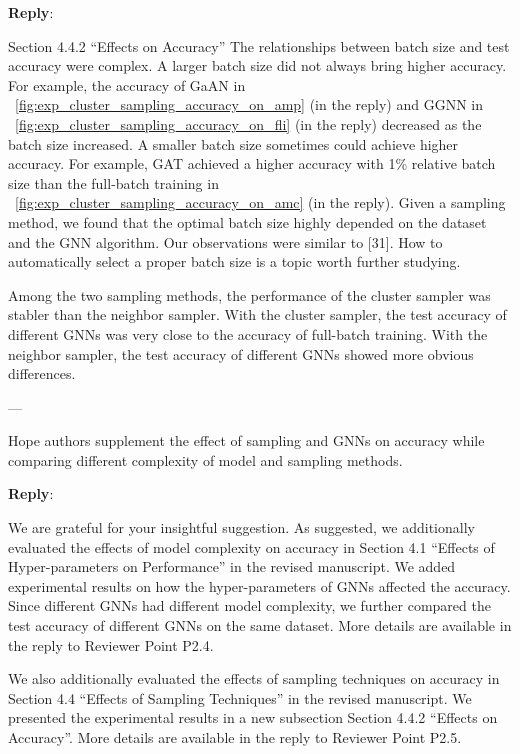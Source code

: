 \documentclass[12pt]{article}
\newenvironment{myquote}[1]%
{\vspace{0.5em}\begin{zitat}{#1}}
{\end{zitat}\vspace{0.5em}}
\newcounter{reviewer}
\newcounter{point}[reviewer]
\renewcommand{\thepoint}{P\,\thereviewer.\arabic{point}}
\newenvironment{point}
   {\refstepcounter{point} \bigskip \noindent {\textbf{Reviewer~Point~\thepoint} } ---\ \begin{sf}}
   {\end{sf} \par}
\newenvironment{reply}
   {\medskip \noindent \textbf{Reply}:\  }
   {\medskip}
\begin{document}
\begin{reply}
\begin{myquote}{Section 4.4.2 ``Effects on Accuracy''}
    The relationships between batch size and test accuracy were complex.
    A larger batch size did not always bring higher accuracy.
    For example, the accuracy of GaAN in \figurename~\ref{fig:exp_cluster_sampling_accuracy_on_amp} (in the reply) and GGNN in \figurename~\ref{fig:exp_cluster_sampling_accuracy_on_fli} (in the reply) decreased as the batch size increased.
    A smaller batch size sometimes could achieve higher accuracy.
    For example, GAT achieved a higher accuracy with 1\% relative batch size than the full-batch training in \figurename~\ref{fig:exp_cluster_sampling_accuracy_on_amc} (in the reply).
    Given a sampling method, we found that the optimal batch size highly depended on the dataset and the GNN algorithm.
    Our observations were similar to [31].
    How to automatically select a proper batch size is a topic worth further studying.
    
    Among the two sampling methods, the performance of the cluster sampler was stabler than the neighbor sampler.
    With the cluster sampler, the test accuracy of different GNNs was very close to the accuracy of full-batch training.
    With the neighbor sampler, the test accuracy of different GNNs showed more obvious differences.
    \end{myquote}
    
\end{reply}

\begin{point}
    Hope authors supplement the effect of sampling and GNNs on accuracy while comparing different complexity of model and sampling methods.
\end{point}

\begin{reply}

    We are grateful for your insightful suggestion.
    As suggested, we additionally evaluated the effects of model complexity on accuracy in Section 4.1 ``Effects of Hyper-parameters on Performance'' in the revised manuscript.
    We added experimental results on how the hyper-parameters of GNNs affected the accuracy.
    Since different GNNs had different model complexity, we further compared the test accuracy of different GNNs on the same dataset.
    More details are available in the reply to Reviewer Point P2.4.
    
    We also additionally evaluated the effects of sampling techniques on accuracy in Section 4.4 ``Effects of Sampling Techniques'' in the revised manuscript.
    We presented the experimental results in a new subsection Section 4.4.2 ``Effects on Accuracy''.
    More details are available in the reply to Reviewer Point P2.5.
\end{reply}
\end{document}
